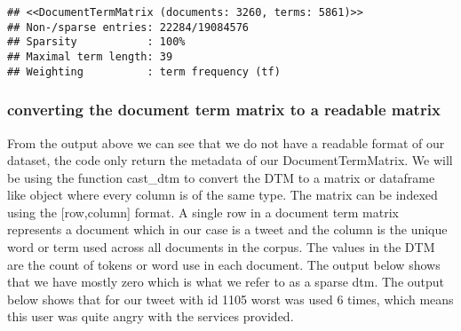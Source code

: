 \documentclass[
]{article}
\newenvironment{Shaded}{\begin{snugshade}}{\end{snugshade}}
\newcommand{\DecValTok}[1]{\textcolor[rgb]{0.00,0.00,0.81}{#1}}
\newcommand{\KeywordTok}[1]{\textcolor[rgb]{0.13,0.29,0.53}{\textbf{#1}}}
\newcommand{\NormalTok}[1]{#1}
\newcommand{\OperatorTok}[1]{\textcolor[rgb]{0.81,0.36,0.00}{\textbf{#1}}}
\newcommand{\StringTok}[1]{\textcolor[rgb]{0.31,0.60,0.02}{#1}}
\begin{document}
\begin{Shaded}
\end{Shaded}

\begin{verbatim}
## <<DocumentTermMatrix (documents: 3260, terms: 5861)>>
## Non-/sparse entries: 22284/19084576
## Sparsity           : 100%
## Maximal term length: 39
## Weighting          : term frequency (tf)
\end{verbatim}

\hypertarget{converting-the-document-term-matrix-to-a-readable-matrix}{%
\subsubsection{converting the document term matrix to a readable
matrix}\label{converting-the-document-term-matrix-to-a-readable-matrix}}

From the output above we can see that we do not have a readable format
of our dataset, the code only return the metadata of our
DocumentTermMatrix. We will be using the function cast\_dtm to convert
the DTM to a matrix or dataframe like object where every column is of
the same type. The matrix can be indexed using the {[}row,column{]}
format. A single row in a document term matrix represents a document
which in our case is a tweet and the column is the unique word or term
used across all documents in the corpus. The values in the DTM are the
count of tokens or word use in each document. The output below shows
that we have mostly zero which is what we refer to as a sparse dtm. The
output below shows that for our tweet with id 1105 worst was used 6
times, which means this user was quite angry with the services provided.

\begin{Shaded}
\end{Shaded}
\end{document}
